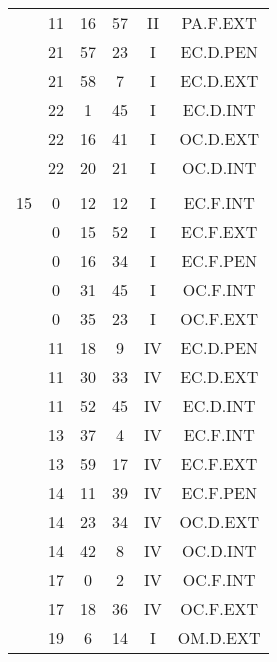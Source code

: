 \documentclass[12pt, a4paper]{article}
\begin{document}
\begin{multicols}{3}
{\begin{tabular}{c c c c c c}
	 	 	 	 & 11 & 16 & 57 & II & PA.F.EXT\\%
	 	 	 	 & 21 & 57 & 23 & I & EC.D.PEN\\%
	 	 	 	 & 21 & 58 & 7 & I & EC.D.EXT\\%
	 	 	 	 & 22 & 1 & 45 & I & EC.D.INT\\%
	 	 	 	 & 22 & 16 & 41 & I & OC.D.EXT\\%
	 	 	 	 & 22 & 20 & 21 & I & OC.D.INT\\%
	 	 	 	 & & & & & \\%
	 	 	 	15 & 0 & 12 & 12 & I & EC.F.INT\\%
	 	 	 	 & 0 & 15 & 52 & I & EC.F.EXT\\%
	 	 	 	 & 0 & 16 & 34 & I & EC.F.PEN\\%
	 	 	 	 & 0 & 31 & 45 & I & OC.F.INT\\%
	 	 	 	 & 0 & 35 & 23 & I & OC.F.EXT\\%
	 	 	 	 & 11 & 18 & 9 & IV & EC.D.PEN\\%
	 	 	 	 & 11 & 30 & 33 & IV & EC.D.EXT\\%
	 	 	 	 & 11 & 52 & 45 & IV & EC.D.INT\\%
	 	 	 	 & 13 & 37 & 4 & IV & EC.F.INT\\%
	 	 	 	 & 13 & 59 & 17 & IV & EC.F.EXT\\%
	 	 	 	 & 14 & 11 & 39 & IV & EC.F.PEN\\%
	 	 	 	 & 14 & 23 & 34 & IV & OC.D.EXT\\%
	 	 	 	 & 14 & 42 & 8 & IV & OC.D.INT\\%
	 	 	 	 & 17 & 0 & 2 & IV & OC.F.INT\\%
	 	 	 	 & 17 & 18 & 36 & IV & OC.F.EXT\\%
	 	 	 	 & 19 & 6 & 14 & I & OM.D.EXT\\%

\end{tabular}}
\end{multicols}
\end{document}
